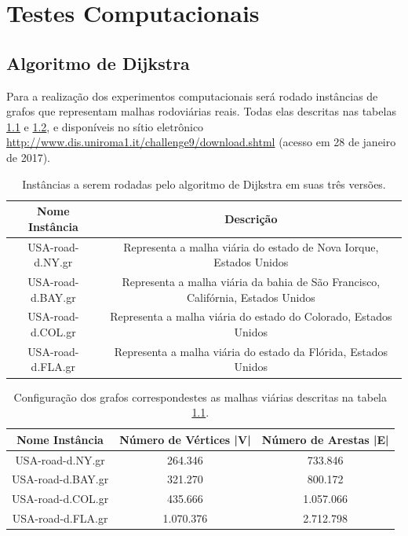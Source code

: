 \chapter{Testes Computacionais}
\label{sec-testes}

\section{Algoritmo de Dijkstra}
\label{sec-dijkstra-experimentos}
Para a realização dos experimentos computacionais será rodado instâncias de grafos que representam malhas rodoviárias reais. Todas elas descritas nas tabelas \ref{tbl-dijkstra-instancias} e \ref{tbl-dijkstra-configuracao}, e disponíveis no sítio eletrônico \url{http://www.dis.uniroma1.it/challenge9/download.shtml} (acesso em 28 de janeiro de 2017).
\begin{table}[H]
\caption{Instâncias a serem rodadas pelo algoritmo de Dijkstra em suas três versões.}
\label{tbl-dijkstra-instancias}
\centering
\begin{adjustbox}{max width=\textwidth}
\begin{tabular}{|c|c|}
\hline 
\textbf{Nome Instância} & \textbf{Descrição} \\ 
\hline 
USA-road-d.NY.gr & Representa a malha viária do estado de Nova Iorque, Estados Unidos \\ 
\hline 
USA-road-d.BAY.gr & Representa a malha viária da bahia de São Francisco, Califórnia, Estados Unidos \\ 
\hline 
USA-road-d.COL.gr & Representa a malha viária do estado do Colorado, Estados Unidos \\ 
\hline 
USA-road-d.FLA.gr & Representa a malha viária do estado da Flórida, Estados Unidos \\ 
\hline 
\end{tabular}
\end{adjustbox}
\end{table}

\begin{table}[H]
\caption{Configuração dos grafos correspondestes as malhas viárias descritas na tabela \ref{tbl-dijkstra-instancias}.}
\label{tbl-dijkstra-configuracao}
\centering
\begin{adjustbox}{max width=\textwidth}
\begin{tabular}{|c|c|c|}
\hline 
\textbf{Nome Instância} & \textbf{Número de Vértices |V|} & \textbf{Número de Arestas |E|} \\ 
\hline 
USA-road-d.NY.gr
 & 264.346
 & 733.846
 \\ 
\hline 
USA-road-d.BAY.gr
 & 321.270
 & 800.172
 \\ 
\hline 
USA-road-d.COL.gr
 & 435.666
 & 1.057.066
 \\ 
\hline 
USA-road-d.FLA.gr
 & 1.070.376
 & 2.712.798
 \\ 
\hline 
\end{tabular}
\end{adjustbox} 
\end{table}

